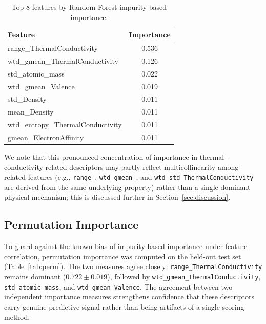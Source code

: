 \documentclass[11pt]{article}
\begin{document}
\begin{table}[htbp]
\centering
\caption{Top 8 features by Random Forest impurity-based importance.}
\label{tab:impurity}
\begin{tabular}{l S[table-format=1.3]}
\toprule
\textbf{Feature} & {\textbf{Importance}} \\
\midrule
range\_ThermalConductivity        & 0.536 \\
wtd\_gmean\_ThermalConductivity   & 0.126 \\
std\_atomic\_mass                 & 0.022 \\
wtd\_gmean\_Valence               & 0.019 \\
std\_Density                      & 0.011 \\
mean\_Density                     & 0.011 \\
wtd\_entropy\_ThermalConductivity & 0.011 \\
gmean\_ElectronAffinity           & 0.011 \\
\bottomrule
\end{tabular}
\end{table}

We note that this pronounced concentration of importance in thermal-conductivity-related descriptors may
partly reflect multicollinearity among related features (e.g., \texttt{range\_}, \texttt{wtd\_gmean\_}, and
\texttt{wtd\_std\_ThermalConductivity} are derived from the same underlying property) rather than a single
dominant physical mechanism; this is discussed further in Section~\ref{sec:discussion}.

\subsection{Permutation Importance}
To guard against the known bias of impurity-based importance under feature correlation, permutation
importance was computed on the held-out test set (Table~\ref{tab:perm}). The two measures agree closely:
\texttt{range\_ThermalConductivity} remains dominant ($0.722 \pm 0.019$), followed by
\texttt{wtd\_gmean\_ThermalConductivity}, \texttt{std\_atomic\_mass}, and \texttt{wtd\_gmean\_Valence}. The
agreement between two independent importance measures strengthens confidence that these descriptors carry
genuine predictive signal rather than being artifacts of a single scoring method.
\end{document}
